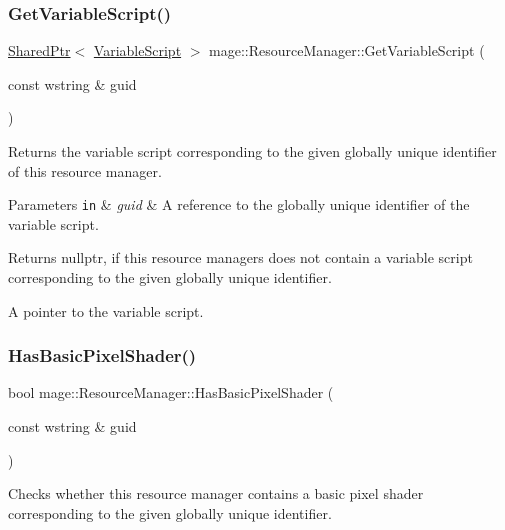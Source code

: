 \subsubsection{\texorpdfstring{Get\+Variable\+Script()}{GetVariableScript()}}
{\footnotesize\ttfamily \hyperlink{namespacemage_a1e01ae66713838a7a67d30e44c67703e}{Shared\+Ptr}$<$ \hyperlink{classmage_1_1_variable_script}{Variable\+Script} $>$ mage\+::\+Resource\+Manager\+::\+Get\+Variable\+Script (\begin{DoxyParamCaption}\item[{const wstring \&}]{guid }\end{DoxyParamCaption})\hspace{0.3cm}{\ttfamily [noexcept]}}

Returns the variable script corresponding to the given globally unique identifier of this resource manager.


\begin{DoxyParams}[1]{Parameters}
\mbox{\tt in}  & {\em guid} & A reference to the globally unique identifier of the variable script. \\
\hline
\end{DoxyParams}
\begin{DoxyReturn}{Returns}
{\ttfamily nullptr}, if this resource managers does not contain a variable script corresponding to the given globally unique identifier. 

A pointer to the variable script. 
\end{DoxyReturn}
\hypertarget{classmage_1_1_resource_manager_a3027058c2b55a131a2070d0f31080c29}{}\label{classmage_1_1_resource_manager_a3027058c2b55a131a2070d0f31080c29} 
\subsubsection{\texorpdfstring{Has\+Basic\+Pixel\+Shader()}{HasBasicPixelShader()}}
{\footnotesize\ttfamily bool mage\+::\+Resource\+Manager\+::\+Has\+Basic\+Pixel\+Shader (\begin{DoxyParamCaption}\item[{const wstring \&}]{guid }\end{DoxyParamCaption})\hspace{0.3cm}{\ttfamily [noexcept]}}

Checks whether this resource manager contains a basic pixel shader corresponding to the given globally unique identifier.


